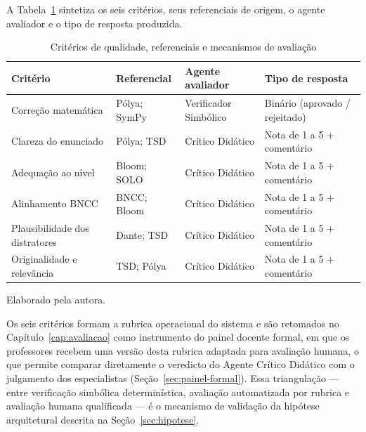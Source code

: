 A Tabela~\ref{tab:criterios} sintetiza os seis critérios, seus referenciais de origem, o agente
avaliador e o tipo de resposta produzida.

\begin{table}[htbp]
\centering
\caption{Critérios de qualidade, referenciais e mecanismos de avaliação}
\label{tab:criterios}
\begin{tabular}{@{}p{3.2cm}p{2.4cm}p{2.8cm}p{3.4cm}@{}}
\toprule
\textbf{Critério} & \textbf{Referencial} & \textbf{Agente avaliador} & \textbf{Tipo de resposta} \\
\midrule
Correção matemática & Pólya; SymPy & Verificador Simbólico & Binário (aprovado / rejeitado) \\
Clareza do enunciado & Pólya; TSD & Crítico Didático & Nota de 1 a 5 + comentário \\
Adequação ao nível & Bloom; SOLO & Crítico Didático & Nota de 1 a 5 + comentário \\
Alinhamento BNCC & BNCC; Bloom & Crítico Didático & Nota de 1 a 5 + comentário \\
Plausibilidade dos distratores & Dante; TSD & Crítico Didático & Nota de 1 a 5 + comentário \\
Originalidade e relevância & TSD; Pólya & Crítico Didático & Nota de 1 a 5 + comentário \\
\bottomrule
\end{tabular}

\smallskip
{\footnotesize Elaborado pela autora.}
\end{table}

Os seis critérios formam a rubrica operacional do sistema e são retomados no Capítulo~\ref{cap:avaliacao}
como instrumento do painel docente formal, em que os professores recebem uma versão desta rubrica
adaptada para avaliação humana, o que permite comparar diretamente o veredicto do Agente Crítico
Didático com o julgamento dos especialistas (Seção~\ref{sec:painel-formal}). Essa triangulação --- entre verificação
simbólica determinística, avaliação automatizada por rubrica e avaliação humana qualificada --- é o
mecanismo de validação da hipótese arquitetural descrita na Seção~\ref{sec:hipotese}.
